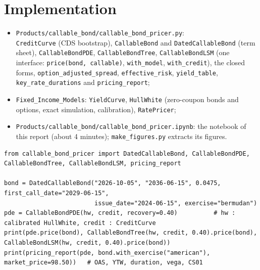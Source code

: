 \documentclass[11pt,a4paper]{article}
\newcommand{\code}[1]{\texttt{#1}}
\begin{document}
\section{Implementation}\label{sec:implementation}
\begin{itemize}
\item \code{Products/callable\_bond/callable\_bond\_pricer.py}:\\ \code{CreditCurve} (CDS bootstrap),
\code{CallableBond} and \code{DatedCallableBond} (term sheet), \code{CallableBondPDE}, \code{CallableBondTree},
\code{CallableBondLSM} (one interface: \code{price(bond, callable)}, \code{with\_model}, \code{with\_credit}), the
closed forms, \code{option\_adjusted\_spread}, \code{effective\_risk}, \code{yield\_table},
\code{key\_rate\_durations} and \code{pricing\_report};
\item \code{Fixed\_Income\_Models}: \code{YieldCurve}, \code{HullWhite} (zero-coupon bonds and options, exact
simulation, calibration), \code{RatePricer};
\item \code{Products/callable\_bond/callable\_bond\_pricer.ipynb}: the notebook of this report (about 4 minutes);
\code{make\_figures.py} extracts its figures.
\end{itemize}

\begin{lstlisting}
from callable_bond_pricer import DatedCallableBond, CallableBondPDE, CallableBondTree, CallableBondLSM, pricing_report

bond = DatedCallableBond("2026-10-05", "2036-06-15", 0.0475, first_call_date="2029-06-15",
                         issue_date="2024-06-15", exercise="bermudan")
pde = CallableBondPDE(hw, credit, recovery=0.40)          # hw : calibrated HullWhite, credit : CreditCurve
print(pde.price(bond), CallableBondTree(hw, credit, 0.40).price(bond), CallableBondLSM(hw, credit, 0.40).price(bond))
print(pricing_report(pde, bond.with_exercise("american"), market_price=98.50))   # OAS, YTW, duration, vega, CS01
\end{lstlisting}

\end{document}

